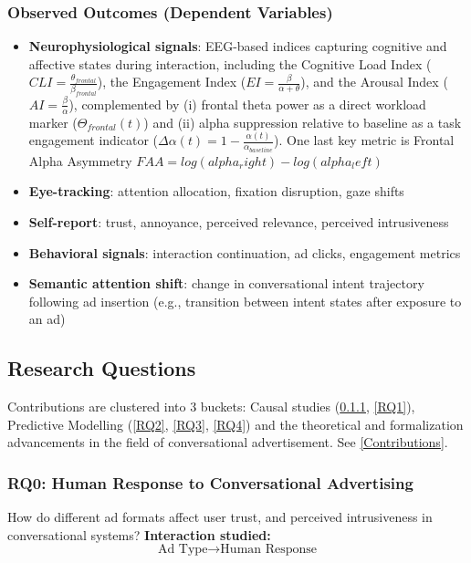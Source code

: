 \documentclass{article}
\begin{document}
\subsubsection{Observed Outcomes (Dependent Variables)}

\begin{itemize}
\item \textbf{Neurophysiological signals}: EEG-based indices capturing cognitive and affective states during interaction, including the Cognitive Load Index ($CLI = \frac{\theta_{frontal}}{\beta_{frontal}}$), the Engagement Index ($EI = \frac{\beta}{\alpha + \theta}$), and the Arousal Index ($AI = \frac{\beta}{\alpha}$), complemented by (i) frontal theta power as a direct workload marker ($\Theta_{frontal}(t)$) and (ii) alpha suppression relative to baseline as a task engagement indicator ($\Delta \alpha(t) = 1 - \frac{\alpha(t)}{\alpha_{baseline}}$). One last key metric is Frontal Alpha Asymmetry $FAA = log(alpha_right) - log(alpha_left)$
    
    \item \textbf{Eye-tracking}: attention allocation, fixation disruption, gaze shifts
    \item \textbf{Self-report}: trust, annoyance, perceived relevance, perceived intrusiveness
    \item \textbf{Behavioral signals}: interaction continuation, ad clicks, engagement metrics
    \item \textbf{Semantic attention shift}: change in conversational intent trajectory following ad insertion (e.g., transition between intent states after exposure to an ad)
\end{itemize}

\newpage 

\subsection{Research Questions}

Contributions are clustered into 3 buckets: Causal studies (\ref{RQ0}, \ref{RQ1}), Predictive Modelling (\ref{RQ2}, \ref{RQ3}, \ref{RQ4}) and the theoretical and formalization advancements in the field of conversational advertisement. See \ref{Contributions}.

\subsubsection{RQ0: Human Response to Conversational Advertising}
\label{RQ0}
How do different ad formats affect user trust, and perceived intrusiveness in conversational systems? 
\vspace{0.3cm}
\textbf{Interaction studied:}
\[
\text{Ad Type} \rightarrow \text{Human Response}
\]
\end{document}
